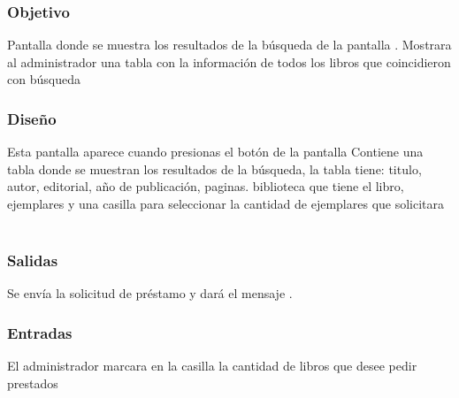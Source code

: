 \subsubsection{Objetivo}
	Pantalla donde se muestra los resultados de la búsqueda de la pantalla . Mostrara al administrador una tabla con la información de todos los libros que coincidieron con búsqueda

\subsubsection{Diseño}
	Esta pantalla aparece cuando presionas el botón  de la pantalla  Contiene una tabla donde se muestran los resultados de la búsqueda, la tabla tiene: titulo, autor, editorial, año de publicación, paginas. biblioteca que tiene el libro, ejemplares y una casilla para seleccionar la cantidad de ejemplares que solicitara  \\\\


\subsubsection{Salidas}
	\begin{Citemize}
		\item Se envía la solicitud de préstamo y dará el mensaje . 
	\end{Citemize}
	
\subsubsection{Entradas}
	\begin{Citemize}
		\item El administrador marcara en la casilla la cantidad de libros que desee pedir prestados
	\end{Citemize}



